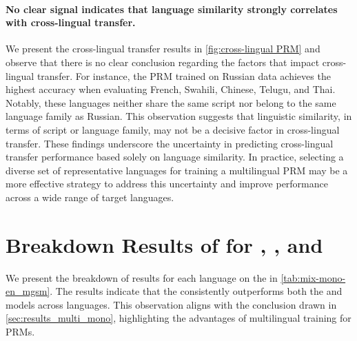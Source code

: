 \paragraph{No clear signal indicates that language similarity strongly correlates with cross-lingual transfer.}

We present the cross-lingual transfer results in \autoref{fig:cross-lingual PRM} and observe that there is no clear conclusion regarding the factors that impact cross-lingual transfer. For instance, the PRM trained on Russian data achieves the highest accuracy when evaluating French, Swahili, Chinese, Telugu, and Thai. Notably, these languages neither share the same script nor belong to the same language family as Russian. This observation suggests that linguistic similarity, in terms of script or language family, may not be a decisive factor in cross-lingual transfer. These findings underscore the uncertainty in predicting cross-lingual transfer performance based solely on language similarity. In practice, selecting a diverse set of representative languages for training a multilingual PRM may be a more effective strategy to address this uncertainty and improve performance across a wide range of target languages.


\section{Breakdown Results of \mgsmset for \mono, \en, and \mix}
\label{sec:appendix_mix_mono_en_mgsm}


We present the breakdown of results for each language on the \mgsmset in \autoref{tab:mix-mono-en_mgsm}. The results indicate that the \mix consistently outperforms both the \mono and \en models across languages. This observation aligns with the conclusion drawn in \autoref{sec:results_multi_mono}, highlighting the advantages of multilingual training for PRMs.
